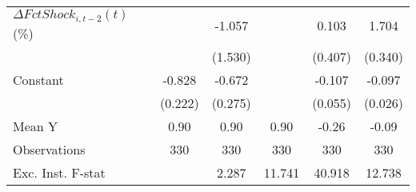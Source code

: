 {\begin{tabular}{l*{5}{c}}
\addlinespace
$ \Delta FctShock_{i,t-2}(t)$ (\%)&                     &      -1.057         &                     &       0.103         &       1.704\sym{***}\\
                    &                     &     (1.530)         &                     &     (0.407)         &     (0.340)         \\
\addlinespace
Constant            &      -0.828\sym{***}&      -0.672\sym{**} &                     &      -0.107\sym{*}  &      -0.097\sym{***}\\
                    &     (0.222)         &     (0.275)         &                     &     (0.055)         &     (0.026)         \\
\midrule
Mean Y              &        0.90         &        0.90         &        0.90         &       -0.26         &       -0.09         \\
Observations        &         330         &         330         &         330         &         330         &         330         \\
Exc. Inst. F-stat   &                     &       2.287         &      11.741         &      40.918         &      12.738         \\
\bottomrule
\end{tabular}
}
